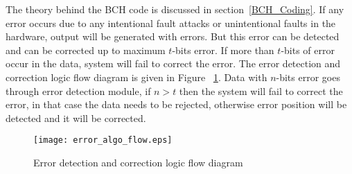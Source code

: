 \documentclass[10pt, conference, compsocconf]{IEEEtran}
\begin{document}
The theory behind the BCH code is discussed in section~\ref{BCH_Coding}. If any error occurs due to any intentional fault attacks or unintentional faults in the hardware, output will be generated with errors. But this error can be detected and can be corrected up to maximum $t$-bits error. If more than $t$-bits of error occur in the data, system will fail to correct the error.
The error detection and correction logic flow diagram is given in Figure ~\ref{fig:ErrorAlgoFlow}. Data with $n$-bits error goes through error detection module, if $ n>t$ then the system will fail to correct the error, in that case the data needs to be rejected, otherwise error position will be detected and it will be corrected. 
\begin{figure}[h]
\centering
\texttt{[image: error\_algo\_flow.eps]}
\caption{Error detection and correction logic flow diagram}
\label{fig:ErrorAlgoFlow}
\end{figure}
\fi
\end{document}
